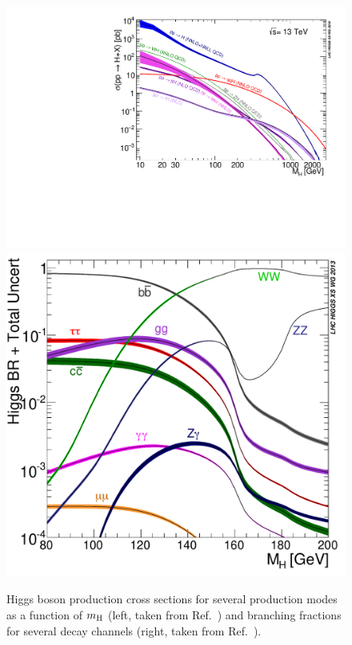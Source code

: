 \begin{figure}[hbtp]
  \begin{center}
    \includegraphics[width=\halflinewidth]{img/theory/mh_production.pdf}
    \includegraphics[width=\halflinewidth]{img/theory/mh_decay.pdf}
    \caption{
        Higgs boson production cross sections for several production modes as a function of $m_{\mathrm{H}}$ (left, taken from Ref.~\cite{deFlorian:2016spz}) and branching fractions for several decay channels (right, taken from Ref.~\cite{LHCHXSWG:YR3}).
        }
    \label{fig:mh-production-decay}
  \end{center}
\end{figure}


